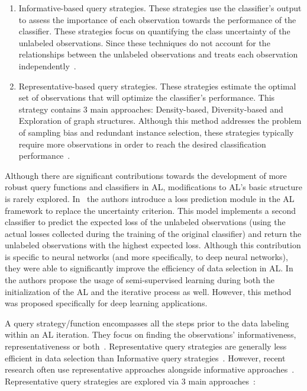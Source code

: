 \begin{enumerate}

    \item Informative-based query strategies. These strategies use the
        classifier's output to assess the importance of each observation
        towards the performance of the classifier. These strategies focus on
        quantifying the class uncertainty of the unlabeled observations.
        Since these techniques do not account for the relationships between
        the unlabeled observations and treats each observation
        independently~\cite{Fu2013}.

    \item Representative-based query strategies. These strategies estimate the
        optimal set of observations that will optimize the classifier's
        performance. This strategy contains 3 main approaches: Density-based,
        Diversity-based and Exploration of graph structures. Although this
        method addresses the problem of sampling bias and redundant instance
        selection, these strategies typically require more observations in
        order to reach the desired classification
        performance~\cite{Kumar2020}.

\end{enumerate}

Although there are significant contributions towards the development of more
robust query functions and classifiers in AL, modifications to AL's basic
structure is rarely explored. In~\cite{Yoo2019} the authors introduce a loss
prediction module in the AL framework to replace the uncertainty criterion.
This model implements a second classifier to predict the expected loss of the
unlabeled observations (using the actual losses collected during the training
of the original classifier) and return the unlabeled observations with the
highest expected loss. Although this contribution is specific to neural
networks (and more specifically, to deep neural networks), they were able to
significantly improve the efficiency of data selection in AL\@.
In~\cite{Simeoni2020} the authors propose the usage of semi-supervised
learning during both the initialization of the AL and the iterative process as
well. However, this method was proposed specifically for deep learning
applications.

A query strategy/function encompasses all the steps prior to the data labeling
within an AL iteration. They focus on finding the observations'
informativeness, representativeness or both~\cite{Gu2021, Kumar2020}.
Representative query strategies are generally less efficient in data selection
than Informative query strategies~\cite{Kumar2020}. However, recent research
often use representative approaches alongside informative
approaches~\cite{Gu2021, Samat2016}. Representative query strategies are
explored via 3 main approaches~\cite{Kumar2020}: 


